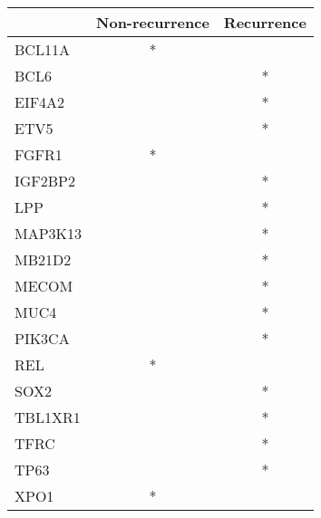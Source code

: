 \begin{tabular}{lcc}
\toprule
{} & Non-recurrence & Recurrence \\
\midrule
BCL11A  &              * &            \\
BCL6    &                &          * \\
EIF4A2  &                &          * \\
ETV5    &                &          * \\
FGFR1   &              * &            \\
IGF2BP2 &                &          * \\
LPP     &                &          * \\
MAP3K13 &                &          * \\
MB21D2  &                &          * \\
MECOM   &                &          * \\
MUC4    &                &          * \\
PIK3CA  &                &          * \\
REL     &              * &            \\
SOX2    &                &          * \\
TBL1XR1 &                &          * \\
TFRC    &                &          * \\
TP63    &                &          * \\
XPO1    &              * &            \\
\bottomrule
\end{tabular}
